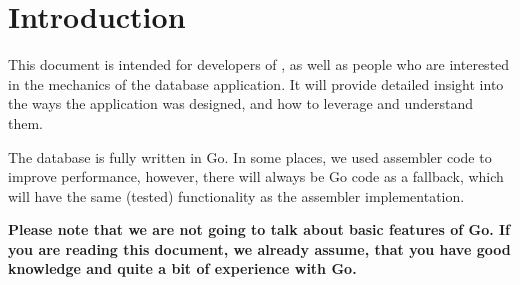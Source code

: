 \section{Introduction}
This document is intended for developers of \xdb{}, as well as people who are interested in the mechanics of the database application.
It will provide detailed insight into the ways the application was designed, and how to leverage and understand them.

The database is fully written in Go.
In some places, we used assembler code to improve performance, however, there will always be Go code as a fallback, which will have the same (tested) functionality as the assembler implementation.

\textbf{Please note that we are not going to talk about basic features of Go. If you are reading this document, we already assume, that you have good knowledge and quite a bit of experience with Go.}